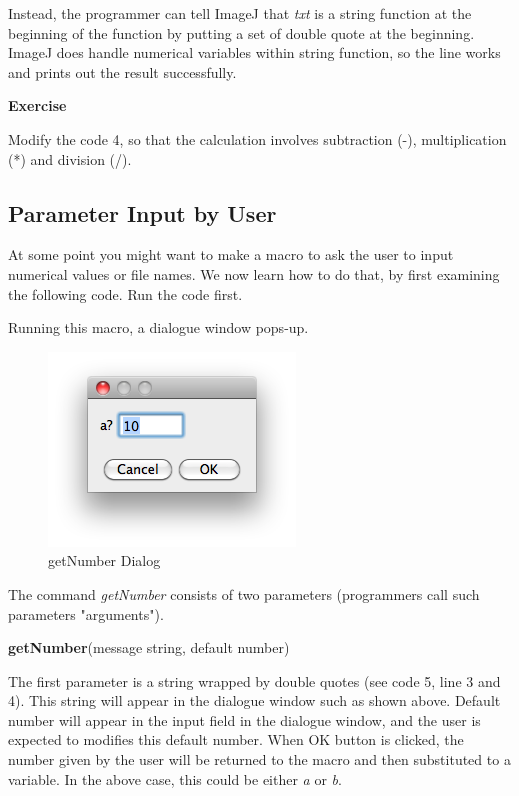 \documentclass[11pt,a4paper,oneside]{report}
\newenvironment{indentexercise}[1]%
{{\setlength{\leftmargin}{2em}}%
\textbf{Exercise \thesubsection-#1}%
\begin{list}{}%
	\item%
}
{\end{list}}
\newenvironment{indentCom}%
{\begin{list}{}%
         {\setlength{\leftmargin}{1em}}%
         \item[]%
}
{\end{list}}
\begin{document}
Instead, the programmer can tell ImageJ that 
\textit{txt} is a string function at the beginning of the function 
by putting a set of double quote at the beginning. 
ImageJ does handle numerical variables within string function, 
so the line works and prints out the result successfully.  

\begin{indentexercise}{2}
Modify the code 4, so that the calculation involves subtraction (-), multiplication (*) and division (/). 
\end{indentexercise}

\subsection{Parameter Input by User}
At some point you might want to make a macro to ask the user to input numerical
values or file names. We now learn how to do that, by first examining the
following code. Run the code first.

Running this macro,  a dialogue window pops-up.

\begin{figure}[htbp]
\begin{center}
\includegraphics[scale=0.6]{fig/getNumberDialog.png}
\caption{getNumber Dialog} \label{fig_getNUmber}
\end{center}
\end{figure}

The command \textit{getNumber} consists of two parameters (programmers call such parameters "arguments").
\begin{indentCom}
\textbf{getNumber}(message string, default number)
\end{indentCom}
The first parameter is a string wrapped by double quotes (see code 5, line 3
and 4). This string will appear in the dialogue window such as shown above. 
Default number will appear in the input field in the dialogue window, 
and the user is expected to modifies this default number. 
When OK button is clicked, the number given by the user will be returned to
the macro and then substituted to a variable. In the above case, this could be
either \textit{a} or \textit{b}.
 
\end{document}
